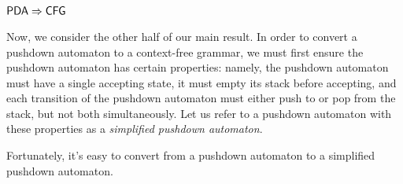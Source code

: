 \subsection{$\textsf{PDA} \Rightarrow \textsf{CFG}$}

Now, we consider the other half of our main result. In order to convert a pushdown automaton to a context-free grammar, we must first ensure the pushdown automaton has certain properties: namely, the pushdown automaton must have a single accepting state, it must empty its stack before accepting, and each transition of the pushdown automaton must either push to or pop from the stack, but not both simultaneously. Let us refer to a pushdown automaton with these properties as a \emph{simplified pushdown automaton}.

Fortunately, it's easy to convert from a pushdown automaton to a simplified pushdown automaton.

